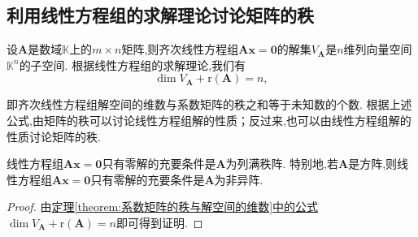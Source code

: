 \documentclass[../../main.tex]{subfiles}
\begin{document}
\subsection{利用线性方程组的求解理论讨论矩阵的秩}

\begin{theorem}\label{theorem:系数矩阵的秩与解空间的维数}
设\(\boldsymbol{A}\)是数域\(\mathbb{K}\)上的\(m\times n\)矩阵,则齐次线性方程组\(\boldsymbol{A}\boldsymbol{x}=\boldsymbol{0}\)的解集\(V_{\boldsymbol{A}}\)是\(n\)维列向量空间\(\mathbb{K}^n\)的子空间. 根据线性方程组的求解理论,我们有
\[
\dim V_{\boldsymbol{A}}+\mathrm{r}(\boldsymbol{A}) = n,
\]
\end{theorem}
\begin{note}
即齐次线性方程组解空间的维数与系数矩阵的秩之和等于未知数的个数. 根据上述公式,由矩阵的秩可以讨论线性方程组解的性质；反过来,也可以由线性方程组解的性质讨论矩阵的秩. 
\end{note}

\begin{corollary}\label{corollary:线性方程组只有零解的充要条件}
线性方程组\(\boldsymbol{A}\boldsymbol{x}=\boldsymbol{0}\)只有零解的充要条件是\(\boldsymbol{A}\)为列满秩阵. 特别地,若\(\boldsymbol{A}\)是方阵,则线性方程组\(\boldsymbol{A}\boldsymbol{x}=\boldsymbol{0}\)只有零解的充要条件是\(\boldsymbol{A}\)为非异阵. 
\end{corollary}
\begin{proof}
由\hyperref[theorem:系数矩阵的秩与解空间的维数]{定理\ref{theorem:系数矩阵的秩与解空间的维数}中的公式}\(\dim V_{\boldsymbol{A}}+\mathrm{r}(\boldsymbol{A}) = n\)即可得到证明.
\end{proof}
\end{document}
